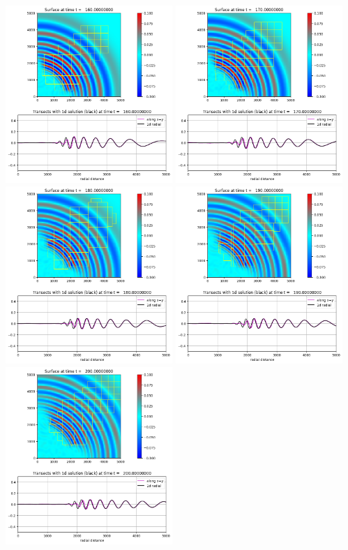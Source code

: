 \documentclass[11pt]{article}
\begin{document}
\vskip 10pt 
\includegraphics[width=0.475\textwidth]{frame0016fig20.png}
\vskip 10pt 
\includegraphics[width=0.475\textwidth]{frame0017fig20.png}
\vskip 10pt 
\includegraphics[width=0.475\textwidth]{frame0018fig20.png}
\vskip 10pt 
\includegraphics[width=0.475\textwidth]{frame0019fig20.png}
\vskip 10pt 
\includegraphics[width=0.475\textwidth]{frame0020fig20.png}
\end{document}
